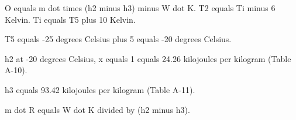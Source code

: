 O equals m dot times (h2 minus h3) minus W dot K.  
T2 equals Ti minus 6 Kelvin.  
Ti equals T5 plus 10 Kelvin.  

T5 equals -25 degrees Celsius plus 5 equals -20 degrees Celsius.  

h2 at -20 degrees Celsius, x equals 1 equals 24.26 kilojoules per kilogram (Table A-10).  

h3 equals 93.42 kilojoules per kilogram (Table A-11).  

m dot R equals W dot K divided by (h2 minus h3).